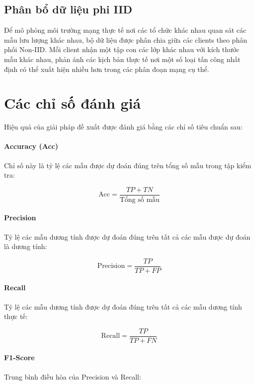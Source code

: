 \subsection{Phân bổ dữ liệu phi IID}
Để mô phỏng môi trường mạng thực tế nơi các tổ chức khác nhau quan sát các mẫu lưu lượng khác nhau, bộ dữ liệu được phân chia giữa các clients theo phân phối Non-IID. Mỗi client nhận một tập con các lớp khác nhau với kích thước mẫu khác nhau, phản ánh các kịch bản thực tế nơi một số loại tấn công nhất định có thể xuất hiện nhiều hơn trong các phân đoạn mạng cụ thể.

\section{Các chỉ số đánh giá}
\label{sec:metrics}

Hiệu quả của giải pháp đề xuất được đánh giá bằng các chỉ số tiêu chuẩn sau:

\paragraph{Accuracy (Acc)} Chỉ số này là tỷ lệ các mẫu được dự đoán đúng trên tổng số mẫu trong tập kiểm tra:

\begin{equation}
\label{eq:accuracy}
\text{Acc} = \frac{TP + TN}{\text{Tổng số mẫu}}
\end{equation}

\paragraph{Precision} Tỷ lệ các mẫu dương tính được dự đoán đúng trên tất cả các mẫu được dự đoán là dương tính:

\begin{equation}
\label{eq:precision}
\text{Precision} = \frac{TP}{TP + FP}
\end{equation}

\paragraph{Recall} Tỷ lệ các mẫu dương tính được dự đoán đúng trên tất cả các mẫu dương tính thực tế:

\begin{equation}
\label{eq:recall}
\text{Recall} = \frac{TP}{TP + FN}
\end{equation}

\paragraph{F1-Score} Trung bình điều hòa của Precision và Recall:

